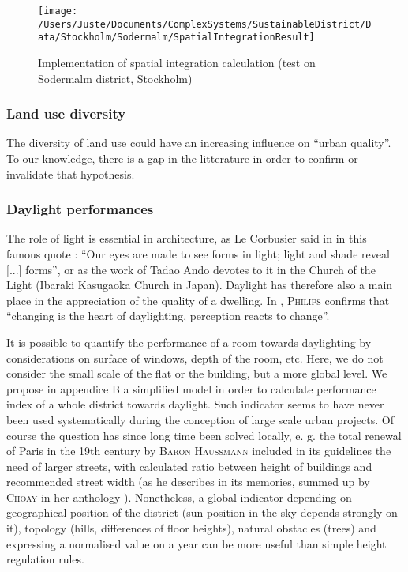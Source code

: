 \documentclass[english]{article}
\newcommand{\noun}[1]{\textsc{#1}}
\begin{document}
\begin{figure}
\hfill{}\texttt{[image: /Users/Juste/Documents/ComplexSystems/SustainableDistrict/Data/Stockholm/Sodermalm/SpatialIntegrationResult]}\hfill{}\caption{Implementation of spatial integration calculation (test on Sodermalm
district, Stockholm)}


\end{figure}



\subsubsection{Land use diversity}

The diversity of land use could have an increasing influence on ``urban
quality''. To our knowledge, there is a gap in the litterature
in order to confirm or invalidate that hypothesis.


\subsubsection{Daylight performances}

The role of light is essential in architecture, as Le Corbusier said
in \cite{corbusier1924vers} in this famous quote : ``Our eyes are
made to see forms in light; light and shade reveal {[}...{]} forms'',
or as the work of Tadao Ando devotes to it in the Church of the Light
(Ibaraki Kasugaoka Church in Japan). Daylight has therefore also a
main place in the appreciation of the quality of a dwelling. In \cite{phillips19232004},
\noun{Philips} confirms that ``changing is the heart of daylighting,
perception reacts to change''.

\bigskip{}


It is possible to quantify the performance of a room towards daylighting
by considerations on surface of windows, depth of the room, etc. Here,
we do not consider the small scale of the flat or the building, but
a more global level. We propose in appendice B a simplified model
in order to calculate performance index of a whole district towards daylight.
Such indicator seems to have
never been used systematically during the conception of large scale
urban projects. Of course the question has since long time been solved
locally, e. g. the total renewal of Paris in the 19th century by \noun{Baron
Haussmann }included in its guidelines the need of larger streets,
with calculated ratio between height of buildings and recommended
street width (as he describes in its memories, summed up by \noun{Choay}
in her anthology \cite{choay1965urbanisme}). Nonetheless, a global indicator
depending on geographical position of the district (sun position in
the sky depends strongly on it), topology (hills, differences of floor
heights), natural obstacles (trees) and expressing a normalised value
on a year can be more useful than simple height regulation rules.
\end{document}
